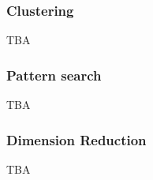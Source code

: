 
\subsubsection{Clustering}
TBA
 

\subsubsection{Pattern search}
TBA

\subsubsection{Dimension Reduction}
TBA

 


\newpage